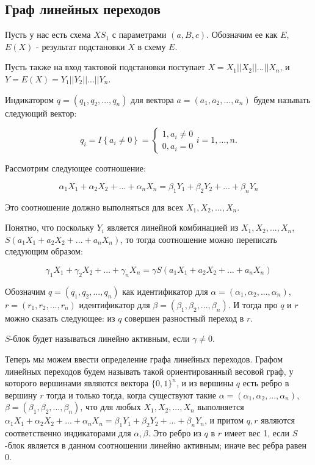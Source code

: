 \documentclass[a4paper,12pt]{extarticle}
\theoremstyle{plain} %
\begin{document}
\begin{large}
\newpage
\section{Граф линейных переходов}

Пусть у нас есть схема $XS_1$ с параметрами $(a, B, c)$. Обозначим ее как $E$,  $E(X)$ - результат подстановки $X$ в схему $E$. 

Пусть также на вход тактовой подстановки поступает $X = X_1||X_2||...||X_n$, и $Y=E(X) = Y_1||Y_2||...||Y_n$.

Индикатором $q = (q_1, q_2, ..., q_n)$ для вектора $a=(a_1, a_2, ..., a_n)$ будем называть следующий вектор:

\begin{equation}
q_i=I\left\{a_i\ne 0\right\}=\left\{ \begin{array}{c}
1,a_i \neq 0 \\
0,a_i = 0\end{array}
\right.i=1,\dots , n.
\end{equation}

Рассмотрим следующее соотношение:

\begin{equation}
\label{eq:lin_proportion}
\alpha_1X_1 + \alpha_2X_2 + ... + \alpha_nX_n = \beta_1Y_1 + \beta_2Y_2 + ... + \beta_nY_n
\end{equation}

Это соотношение должно выполняться для всех $X_1, X_2, ..., X_n$.

Понятно, что поскольку $Y_i$ является линейной комбинацией из $X_1, X_2, ..., X_n$, $S(a_1X_1 + a_2X_2 + ... + a_nX_n)$, то тогда соотношение можно переписать следующим образом:

\begin{equation}\label{eq:in_gamma}
\gamma_1X_1 + \gamma_2X_2 + ... + \gamma_nX_n = \gamma S(a_1X_1 + a_2X_2 + ... + a_nX_n)\end{equation}

Обозначим $q=(q_1, q_2, ..., q_n)$ как идентификатор для $\alpha=(\alpha_1, \alpha_2, ..., \alpha_n)$, $r=(r_1, r_2, ..., r_n)$ идентификатор для $\beta = (\beta_1, \beta_2, ..., \beta_n)$. И тогда про $q$ и $r$ можно сказать следующее: из $q$ совершен разностный переход в $r$. 

$S$-блок будет называться линейно активным, если $\gamma \neq 0$.

Теперь мы можем ввести определение графа линейных переходов. Графом линейных переходов будем называть такой ориентированный весовой граф, у которого вершинами являются вектора $\{0, 1\}^n$, и из вершины $q$ есть ребро в вершину $r$ тогда и только тогда, когда существуют такие $\alpha = (\alpha_1, \alpha_2, ..., \alpha_n)$, $\beta = (\beta_1, \beta_2, ..., \beta_n)$, что для любых $X_1, X_2, ..., X_n$ выполняется $\alpha_1X_1 + \alpha_2X_2 + ... + \alpha_nX_n = \beta_1Y_1 + \beta_2Y_2 + ... + \beta_nY_n$, и притом $q, r$ являются соответственно индикаторами для $\alpha, \beta$. Это ребро из $q$ в $r$ имеет вес 1, если $S$-блок является в данном соотношении линейно активным; иначе вес ребра равен 0.


\end{large}
\end{document}
